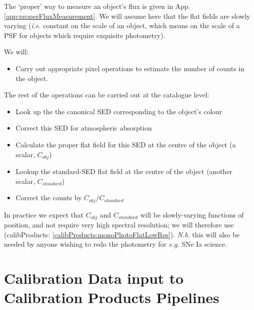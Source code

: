 \documentclass[12pt]{article}
\newcommand{\eg}{\textit{e.g.}\xspace}
\newcommand{\ie}{\textit{i.e.}\xspace}
\newcommand{\Nb}{\textit{N.b.}\xspace}
\newcommand{\outputData}[1]{(calibProducts: \ref{calibProducts:#1})}
\newcommand{\appRef}[1]{App. \ref{app:#1}}
\begin{document}
The `proper' way to measure an object's flux is given in \appRef{properFluxMeasurement}.  We will assume
here that the flat fields are slowly varying (\ie constant on the scale of an object, which means
on the scale of a PSF for objects which require exquisite photometry).

We will:
\begin{itemize}
\item Carry out appropriate pixel operations to estimate the number of counts in the object.
\end{itemize}
The rest of the operations can be carried out at the catalogue level:
\begin{itemize}
\item Look up the the canonical SED corresponding to the object's colour
\item Correct this SED for atmospheric absorption
\item Calculate the proper flat field for this SED at the centre of the object (a scalar, $C_{obj}$)
\item Lookup the standard-SED flat field at the centre of the object (another scalar, $C_{standard}$)
\item Correct the counts by $C_{obj}/C_{standard}$
\end{itemize}

In practice
we expect that  $C_{obj}$ and $C_{standard}$ will be slowly-varying functions of position, and not
require very high spectral resolution;  we will therefore use \outputData{monoPhotoFlatLowRes}.  \Nb
this will also be needed by anyone wishing to redo the photometry for \eg SNe Ia science.


\appendix

\section{Calibration Data input to Calibration Products Pipelines}
\label{sec:calibrationInputDatasets}
\end{document}
